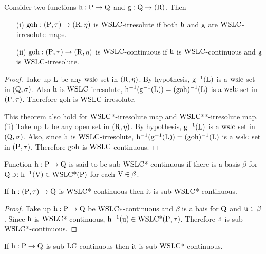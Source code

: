 \begin{thm}\label{thm6.4.7}
Consider two functions $\mathrm{h}: \mathrm{P} \to \mathrm{Q}$ and $\mathrm{g}: \mathrm{Q}\to (\mathrm{R})$. Then
\begin{itemize}
\item[(i)] $\mathrm{goh} : (\mathrm{P}, \tau) \to (\mathrm{R}, \eta)$ is $\mathrm{WSLC}$-irresolute if both $\mathrm{h}$ and $\mathrm{g}$ are $\mathrm{WSLC}$-irresolute maps.
\item[(ii)] $\mathrm{goh}: (\mathrm{P}, \tau) \to (\mathrm{R}, \eta)$ is $\mathrm{WSLC}$-continuous if $\mathrm{h}$ is $\mathrm{WSLC}$-continuous and $\mathrm{g}$ is $\mathrm{WSLC}$-irresolute.
\end{itemize}
\end{thm}

\begin{proof}
Take up $\mathrm{L}$ be any $\mathrm{ws}\mathrm{lc}$ set in $(\mathrm{R}, \eta)$. By hypothesis, $\mathrm{g}^{-1} (\mathrm{L})$ is a $\mathrm{ws}\mathrm{lc}$ set in $(\mathrm{Q}, \sigma)$. Also $\mathrm{h}$ is $\mathrm{WSLC}$-irresolute, $\mathrm{h}^{-1} (\mathrm{g}^{-1} (\mathrm{L})) = (\mathrm{goh})^{-1} (\mathrm{L})$ is a $\mathrm{ws}\mathrm{lc}$ set in $(\mathrm{P}, \tau)$. Therefore goh is $\mathrm{WSLC}$-irresolute.

This theorem also hold for $\mathrm{WSLC}$*-irresolute map and $\mathrm{WSLC}${*}{*}-irresolute map. (ii) Take up $\mathrm{L}$ be any open set in $(\mathrm{R}, \eta)$. By hypothesis, $\mathrm{g}^{-1} (\mathrm{L})$ is a $\mathrm{ws}\mathrm{lc}$ set in $(\mathrm{Q}, \sigma)$. Also, since $\mathrm{h}$ is $\mathrm{WSLC}$-irresolute, $\mathrm{h}^{-1} (\mathrm{g}^{-1} (\mathrm{L})) = (\mathrm{goh})^{-1} (\mathrm{L})$ is a $\mathrm{ws}\mathrm{lc}$ set in $(\mathrm{P}, \tau)$. Therefore $\mathrm{goh}$ is $\mathrm{WSLC}$-continuous.
\end{proof}

\begin{dfn}\label{defi6.4.8}
Function $\mathrm{h}: \mathrm{P} \to \mathrm{Q}$ is said to be sub-$\mathrm{WSLC}$*-continuous if there is a basis $\beta$ for $\mathrm{Q}\ni: \mathrm{h}^{-1} (\mathrm{V}) \in \mathrm{WSLC}\text{*}(\mathrm{P})$ for each $\mathrm{V} \in \beta$.
\end{dfn}

\begin{thm}\label{thm6.4.9}
If $\mathrm{h} : (\mathrm{P}, \tau) \to \mathrm{Q}$ is $\mathrm{WSLC}$*-continuous then it is sub-$\mathrm{WSLC}$*-continuous.
\end{thm}

\begin{proof}
Take up $\mathrm{h}: \mathrm{P} \to \mathrm{Q}$ be $\mathrm{WSLC}*$-continuous and $\beta$ is a bais for $\mathrm{Q}$ and $\mathrm{u} \in \beta$. Since $\mathrm{h}$ is $\mathrm{WSLC}$*-continuous, $\mathrm{h}^{-1}(\mathrm{u}) \in \mathrm{WSLC} \text{*} (\mathrm{P}, \tau)$. Therefore $\mathrm{h}$ is sub-$\mathrm{WSLC}$*-continuous.
\end{proof}

\begin{thm}\label{thm6.4.10}
If $\mathrm{h}: \mathrm{P} \to \mathrm{Q}$ is sub-$\mathrm{LC}$-continuous then it is sub-$\mathrm{WSLC}$*-continuous.
\end{thm}

